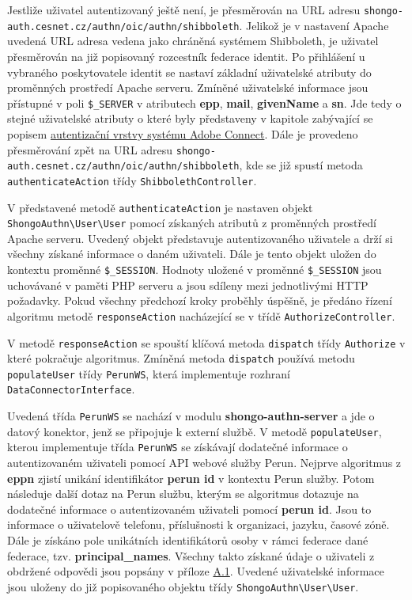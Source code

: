 \documentclass[
  printed, %
  twoside, %
  table,   %
  nolof,     %
  nolot,     %
]{fithesis3}
\begin{document}
Jestliže uživatel autentizovaný ještě není, je přesměrován na URL adresu \texttt{shongo-auth.cesnet.cz/authn/oic/authn/shibboleth}. Jelikož je v nastavení Apache uvedená URL adresa vedena jako chráněná systémem Shibboleth, je uživatel přesměrován na již popisovaný rozcestník federace identit. Po přihlášení u vybraného poskytovatele identit se nastaví základní uživatelské atributy do proměnných prostředí Apache serveru. Zmíněné uživatelské informace jsou přístupné v poli \texttt{\$\_SERVER} v atributech \textbf{epp}, \textbf{mail}, \textbf{givenName} a \textbf{sn}. Jde tedy o stejné uživatelské atributy o které byly představeny v kapitole zabývající se popisem \hyperref[item:adobe-connect]{autentizační vrstvy systému Adobe Connect}. Dále je provedeno přesměrování zpět na URL adresu \texttt{shongo-auth.cesnet.cz/authn/oic/authn/shibboleth}, kde se již spustí metoda \texttt{authenticateAction} třídy \texttt{ShibbolethController}. \par

V představené metodě \texttt{authenticateAction} je nastaven objekt \texttt{ShongoAuthn\textbackslash User\textbackslash User} pomocí získaných atributů z proměnných prostředí Apache serveru. Uvedený objekt představuje autentizovaného uživatele a drží si všechny získané informace o daném uživateli. Dále je tento objekt uložen do kontextu proměnné \texttt{\$\_SESSION}. Hodnoty uložené v proměnné \texttt{\$\_SESSION} jsou uchovávané v paměti PHP serveru a jsou sdíleny mezi jednotlivými HTTP požadavky. Pokud všechny předchozí kroky proběhly úspěšně, je předáno řízení algoritmu metodě \texttt{responseAction} nacházející se v třídě \texttt{AuthorizeController}. \par

\label{sec:responseAction}
V metodě \texttt{responseAction} se spouští klíčová metoda \texttt{dispatch} třídy \texttt{Authorize} v které pokračuje algoritmus. Zmíněná metoda \texttt{dispatch} používá metodu \texttt{populateUser} třídy \texttt{PerunWS}, která implementuje rozhraní \texttt{DataConnectorInterface}. \par

Uvedená třída \texttt{PerunWS} se nachází v modulu \textbf{shongo-authn-server} a jde o datový konektor, jenž se připojuje k externí službě. V metodě \texttt{populateUser}, kterou implementuje třída \texttt{PerunWS} se získávají dodatečné informace o autentizovaném uživateli pomocí API webové služby Perun. Nejprve algoritmus z \textbf{eppn} zjistí unikání identifikátor \textbf{perun id} v kontextu Perun služby. Potom následuje další dotaz na Perun službu, kterým se algoritmus dotazuje na dodatečné informace o autentizovaném uživateli pomocí \textbf{perun id}. Jsou to informace o uživatelově telefonu, příslušnosti k organizaci, jazyku, časové zóně. Dále je získáno pole unikátních identifikátorů osoby v rámci federace dané federace, tzv. \textbf{principal\_names}. Všechny takto získané údaje o uživateli z obdržené odpovědi jsou popsány v příloze \hyperref[table:perunws:user]{A.1}. Uvedené uživatelské informace jsou uloženy do již popisovaného objektu třídy \texttt{ShongoAuthn\textbackslash User\textbackslash User}. \par
\end{document}
